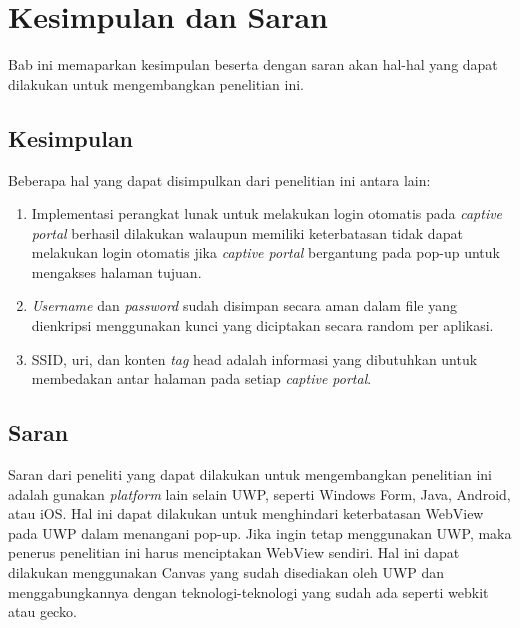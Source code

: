 \chapter{Kesimpulan dan Saran}
\label{chap:kesimpulan_dan_saran}

Bab ini memaparkan kesimpulan beserta dengan saran akan hal-hal yang dapat dilakukan untuk mengembangkan penelitian ini.



\section{Kesimpulan}
\label{sec:kesimpulan}

Beberapa hal yang dapat disimpulkan dari penelitian ini antara lain:

\begin{enumerate}
    \item{Implementasi perangkat lunak untuk melakukan login otomatis pada \textit{captive portal} berhasil dilakukan walaupun memiliki keterbatasan tidak dapat melakukan login otomatis jika \textit{captive portal} bergantung pada pop-up untuk mengakses halaman tujuan.}
    \item{\textit{Username} dan \textit{password} sudah disimpan secara aman dalam file yang dienkripsi menggunakan kunci yang diciptakan secara random per aplikasi.}
    \item{SSID, uri, dan konten \textit{tag} head adalah informasi yang dibutuhkan untuk membedakan antar halaman pada setiap \textit{captive portal}.}
\end{enumerate}



\section{Saran}
\label{sec:saran}

Saran dari peneliti yang dapat dilakukan untuk mengembangkan penelitian ini adalah gunakan \textit{platform} lain selain UWP, seperti Windows Form, Java, Android, atau iOS. Hal ini dapat dilakukan untuk menghindari keterbatasan WebView pada UWP dalam menangani pop-up. Jika ingin tetap menggunakan UWP, maka penerus penelitian ini harus menciptakan WebView sendiri. Hal ini dapat dilakukan menggunakan Canvas yang sudah disediakan oleh UWP dan menggabungkannya dengan teknologi-teknologi yang sudah ada seperti webkit atau gecko.